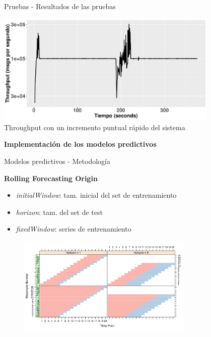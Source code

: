 \documentclass[12pt, spanish]{beamer}
\begin{document}
\begin{frame}{Pruebas - Resultados de las pruebas} %
    \begin{center}
        \includegraphics[width=0.8\textwidth]{images/th_test_spike_25k-113k_100000.pdf}\\
        {\small Throughput con un incremento puntual rápido del sistema}
    \end{center}
\end{frame}


\begin{frame}%
    \begin{center}
        {\Large\textbf{Implementación de los modelos predictivos}}
    \end{center}
\end{frame}

\begin{frame}{Modelos predictivos - Metodología} %
    
    \textbf{Rolling Forecasting Origin}
    \begin{itemize}
        \item \textit{initialWindow}: tam. inicial del set de entrenamiento
        \item \textit{horizon}: tam. del set de test
        \item \textit{fixedWindow}: series de entrenamiento 
    \end{itemize}
    
    \begin{figure}
        \centering
        \includegraphics[width=0.75\textwidth]{images/time-series.png}
    \end{figure}
\end{frame}
\end{document}
